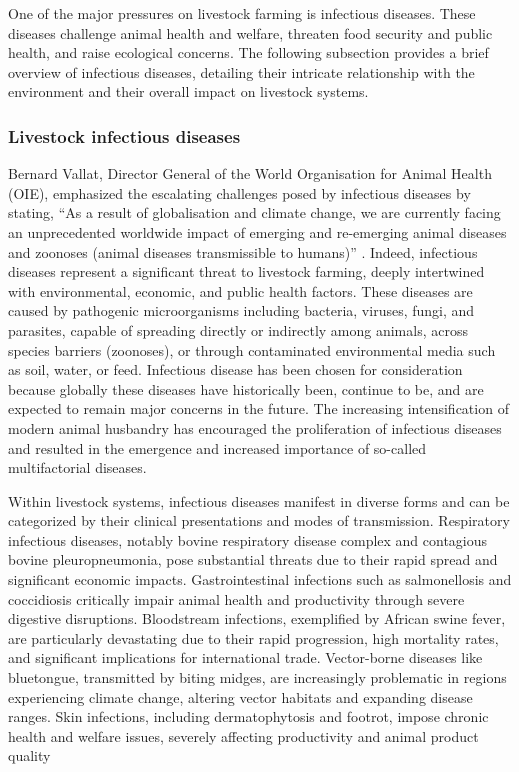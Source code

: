 One of the major pressures on livestock farming is infectious diseases. These diseases challenge animal health and welfare, threaten food security and public health, and raise ecological concerns. The following subsection provides a brief overview of infectious diseases, detailing their intricate relationship with the environment and their overall impact on livestock systems.


\subsubsection*{Livestock infectious diseases}

Bernard Vallat, Director General of the World Organisation for Animal Health (OIE), emphasized the escalating challenges posed by infectious diseases by stating, “As a result of globalisation and climate change, we are currently facing an unprecedented worldwide impact of emerging and re-emerging animal diseases and zoonoses (animal diseases transmissible to humans)” \cite{vallat2007protecting}. Indeed, infectious diseases represent a significant threat to livestock farming, deeply intertwined with environmental, economic, and public health factors. These diseases are caused by pathogenic microorganisms including bacteria, viruses, fungi, and parasites, capable of spreading directly or indirectly among animals, across species barriers (zoonoses), or through contaminated environmental media such as soil, water, or feed. Infectious disease has been chosen for consideration because globally these diseases have historically been, continue to be, and are expected to remain major concerns in the future. The increasing intensification of modern animal husbandry has encouraged the proliferation of infectious diseases and resulted in the emergence and increased importance of so-called multifactorial diseases.

Within livestock systems, infectious diseases manifest in diverse forms and can be categorized by their clinical presentations and modes of transmission. Respiratory infectious diseases, notably bovine respiratory disease complex and contagious bovine pleuropneumonia, pose substantial threats due to their rapid spread and significant economic impacts. Gastrointestinal infections such as salmonellosis and coccidiosis critically impair animal health and productivity through severe digestive disruptions. Bloodstream infections, exemplified by African swine fever, are particularly devastating due to their rapid progression, high mortality rates, and significant implications for international trade. Vector-borne diseases like bluetongue, transmitted by biting midges, are increasingly problematic in regions experiencing climate change, altering vector habitats and expanding disease ranges. Skin infections, including dermatophytosis and footrot, impose chronic health and welfare issues, severely affecting productivity and animal product quality \cite{gilbert2024quantifying}

